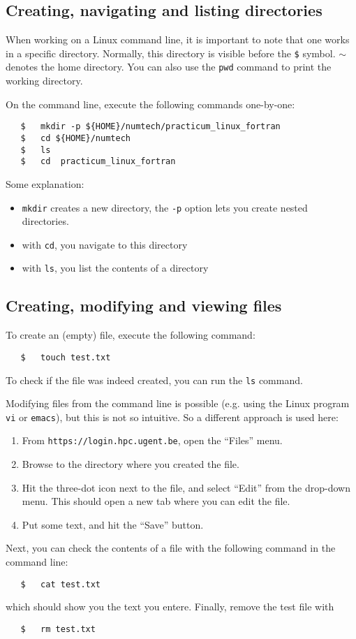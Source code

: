 \documentclass[a4paper]{article}
\begin{document}
\subsection{Creating, navigating and listing directories}
%
\par
When working on a Linux command line, it is important to note that one works in a specific directory. Normally, this directory is visible before the \texttt{\$} symbol. $\sim$ denotes the home directory. You can also use the \verb+pwd+ command to print the working directory.
%
\par
On the command line, execute the following commands one-by-one:
%
\begin{verbatim}
   $   mkdir -p ${HOME}/numtech/practicum_linux_fortran
   $   cd ${HOME}/numtech
   $   ls
   $   cd  practicum_linux_fortran
\end{verbatim}
%
Some explanation:
%
\begin{itemize}
	\item \texttt{mkdir} creates a new directory, the \texttt{-p} option lets you create nested directories.
	\item with \texttt{cd}, you navigate to this directory
	\item with \texttt{ls}, you list the contents of a directory
\end{itemize}
%
%
\subsection{Creating, modifying and viewing files}
%
\par
To create an (empty) file, execute the following command:
%
\begin{verbatim}
   $   touch test.txt
\end{verbatim}
%
To check if the file was indeed created, you can run the \texttt{ls} command.
%
\par
Modifying files from the command line is possible (e.g. using the Linux program \texttt{vi} or \texttt{emacs}), but this is not so intuitive. So a different approach is used here:
\begin{enumerate}
	\item From \texttt{https://login.hpc.ugent.be}, open the ``Files'' menu.
	\item Browse to the directory where you created the file.
	\item Hit the three-dot icon next to the file, and select ``Edit'' from the drop-down menu. This should open a new tab where you can edit the file.
	\item Put some text, and hit the ``Save'' button.
\end{enumerate}
%
\par
Next, you can check the contents of a file with the following command in the command line:
%
\begin{verbatim}
   $   cat test.txt
\end{verbatim}
%
which should show you the text you entere. Finally, remove the test file with 
%
\begin{verbatim}
   $   rm test.txt
\end{verbatim}
%
\end{document}
